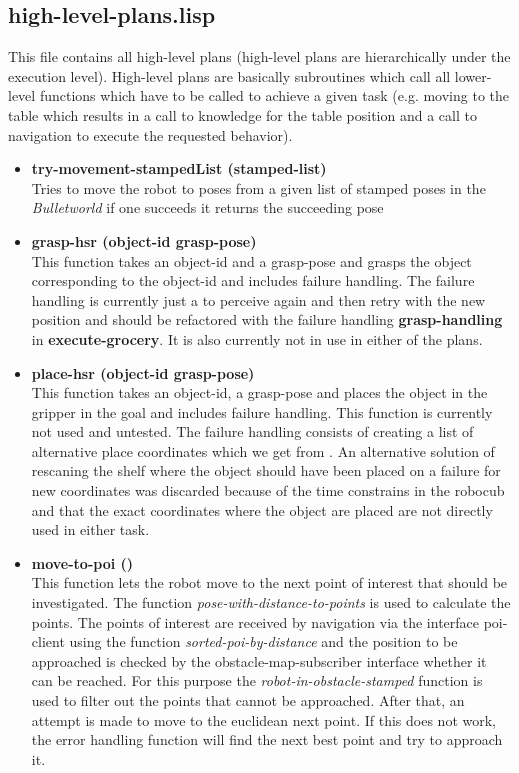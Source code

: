 \documentclass[main.tex]{subfiles}
\begin{document}
        \subsection{high-level-plans.lisp}
        \label{high-level}
        This file contains all high-level plans (high-level plans are hierarchically under the execution level). High-level plans are basically subroutines which call all lower-level functions which have to be called to achieve a given task (e.g. moving to the table which results in a call to knowledge for the table position and a call to navigation to execute the requested behavior).
        \begin{itemize}
        \item \textbf{try-movement-stampedList (stamped-list)} \\
        Tries to move the robot to poses from a given list of stamped poses in the \textit{Bulletworld} if one succeeds it returns the succeeding pose 
        \item \textbf{grasp-hsr (object-id grasp-pose)} \\
        This function takes an object-id and a grasp-pose and grasps the object corresponding to the object-id and includes failure handling. The failure handling is currently just a to perceive again and then retry with the new position and should be refactored with the failure handling \textbf{grasp-handling} in \textbf{execute-grocery}.
        It is also currently not in use in either of the plans.
        \item \textbf{place-hsr (object-id grasp-pose)} \\
        This function takes an object-id, a grasp-pose and places the object in the gripper in the goal and includes failure handling. This function is currently not used and untested. The failure handling consists of creating a list of alternative place coordinates which we get from . An alternative solution of rescaning the shelf where the object should have been placed on a failure for new coordinates was discarded because of the time constrains in the robocub and that the exact coordinates where the object are placed are not directly used in either task. 
        \item \textbf{move-to-poi ()} \\
        This function lets the robot move to the next point of interest that should be investigated. The function \textit{pose-with-distance-to-points} is used to calculate the points. The points of interest are received by navigation via the interface poi-client using the function \textit{sorted-poi-by-distance} and the position to be approached is checked by the obstacle-map-subscriber interface whether it can be reached. For this purpose the \textit{robot-in-obstacle-stamped} function is used to filter out the points that cannot be approached. After that, an attempt is made to move to the euclidean next point. If this does not work, the error handling function will find the next best point and try to approach it.

\end{itemize}
\end{document}

